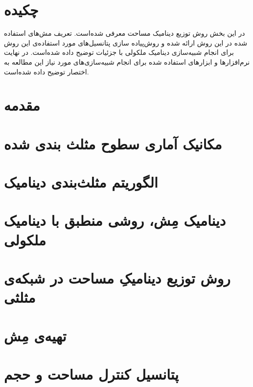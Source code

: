\setRL
\clearpage
\def \MemMethod {\Mempath /MembraneMethod}

\section{
چکیده
}
در این بخش روش توزیع دینامیک مساحت معرفی شده‌است. تعریف مش‌های استفاده شده در این روش ارائه شده و روش‌پیاده سازی پتانسیل‌های مورد استفاده‌ی این روش برای انجام شبیه‌سازی دینامیک ملکولی با جزئیات توضیح داده شده‌است. در نهایت نرم‌افزار‌ها و ابزارهای استفاده شده برای انجام شبیه‌سازی‌های مورد نیاز این مطالعه به اختصار توضیح داده شده‌است.

\section{
مقدمه
}



\section{\label{sec:statMech}
مکانیک آماری سطوح مثلث بندی شده
}


\section{
الگوریتم مثلث‌بندی دینامیک
}


\section{
دینامیک مِش، روشی منطبق با دینامیک ملکولی
}




\section{
روش توزیع دینامیکِ مساحت در شبکه‌ی مثلثی
}


\section{
تهیه‌ی مِش
}


\section{\label{sec:areaVolumeD}
پتانسیل کنترل مساحت و حجم
}


